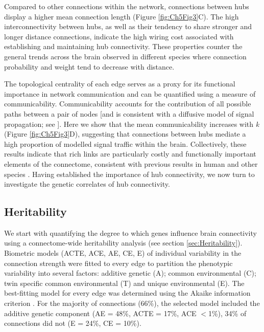 Compared to other connections within the network, connections between hubs display a higher mean connection length (Figure \ref{fig:Ch5Fig3}C). The high interconnectivity between hubs, as well as their tendency to share stronger and longer distance connections, indicate the high wiring cost associated with establishing and maintaining hub connectivity. These properties counter the general trends across the brain observed in different species where connection probability \citep{Arnatkeviciute2018,Fornito2019,Fulcher2016} and weight \citep{Betzel2018} tend to decrease with distance.

The topological centrality of each edge serves as a proxy for its functional importance in network communication and can be quantified using a measure of communicability. Communicability accounts for the contribution of all possible paths between a pair of nodes [and is consistent with a diffusive model of signal propagation; see \citep{Avena-Koenigsberger2017}]. Here we show that the mean communicability increases with \textit{k} (Figure \ref{fig:Ch5Fig3}D), suggesting that connections between hubs mediate a high proportion of modelled signal traffic within the brain. Collectively, these results indicate that rich links are particularly costly and functionally important elements of the connectome, consistent with previous results in human \citep{VandenHeuvel2011} and other species \citep{Arnatkeviciute2018,Fulcher2016,Towlson2013}. Having established the importance of hub connectivity, we now turn to investigate the genetic correlates of hub connectivity.

\subsection{Heritability}

We start with quantifying the degree to which genes influence brain connectivity using a connectome-wide heritability analysis (see section \ref{sec:Heritability}). Biometric models (ACTE, ACE, AE, CE, E) of individual variability in the connection strength were fitted to every edge to partition the phenotypic variability into several factors: additive genetic (A); common environmental (C); twin specific common environmental (T) and unique environmental (E). The best-fitting model for every edge was determined using the Akaike information criterion \citep{Akaike1998}. For the majority of connections (66\%), the selected model included the additive genetic component (AE = 48\%, ACTE = 17\%, ACE $<$1\%), 34\% of connections did not (E = 24\%, CE = 10\%).

